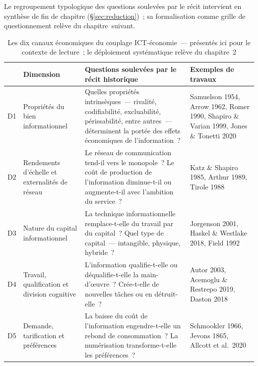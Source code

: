 Le regroupement typologique des questions soulevées par le récit intervient en synthèse de fin de chapitre (\S\ref{sec:reduction})~; sa formalisation comme grille de questionnement relève du chapitre~suivant.

\iffalse
\begin{table}[htbp]
\caption{Les dix canaux économiques du couplage ICT-économie~--- présentés ici pour le contexte de lecture~; le déploiement systématique relève du chapitre~2}\label{tab:dimensions}
\centering\small
\begin{tabularx}{\textwidth}{@{}cp{3.2cm}Xp{3.8cm}@{}}
\toprule
 & \textbf{Dimension} & \textbf{Questions soulevées par le récit historique} & \textbf{Exemples de travaux} \\
\midrule
D1 & Propriétés du bien informationnel & Quelles propriétés intrinsèques~--- rivalité, codifiabilité, excluabilité, périssabilité, entre autres~--- déterminent la portée des effets économiques de l'information~? & Samuelson 1954, Arrow 1962, Romer 1990, Shapiro \& Varian 1999, Jones \& Tonetti 2020 \\[4pt]
D2 & Rendements d'échelle et externalités de réseau & Le réseau de communication tend-il vers le monopole~? Le coût de production de l'information diminue-t-il ou augmente-t-il avec l'ambition du service~? & Katz \& Shapiro 1985, Arthur 1989, Tirole 1988 \\[4pt]
D3 & Nature du capital informationnel & La technique informationnelle remplace-t-elle du travail par du capital~? Quel type de capital~--- intangible, physique, hybride~? & Jorgenson 2001, Haskel \& Westlake 2018, Field 1992 \\[4pt]
D4 & Travail, qualification et division cognitive & L'information qualifie-t-elle ou déqualifie-t-elle la main-d'\oe{}uvre~? Crée-t-elle de nouvelles tâches ou en détruit-elle~? & Autor 2003, Acemoglu \& Restrepo 2019, Daston 2018 \\[4pt]
D5 & Demande, tarification et préférences & La baisse du coût de l'information engendre-t-elle un rebond de consommation~? La numérisation transforme-t-elle les préférences~? & Schmookler 1966, Jevons 1865, Allcott et al.\ 2020 \\[4pt]

\end{tabularx}
\end{table}
